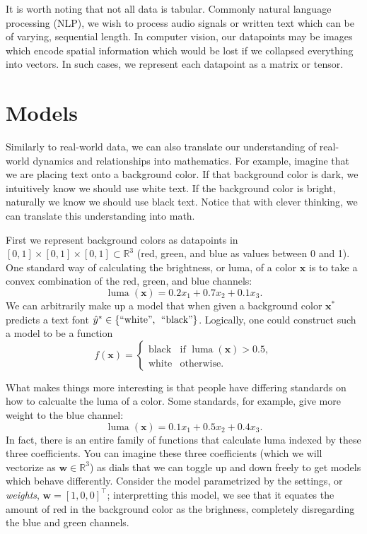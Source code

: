 It is worth noting that not all data is tabular. Commonly natural language processing (NLP), we wish to process audio signals or written text which can be of varying, sequential length. In computer vision, our datapoints may be images which encode spatial information which would be lost if we collapsed everything into vectors. In such cases, we represent each datapoint as a matrix or tensor.

\section{Models}
Similarly to real-world data, we can also translate our understanding of real-world dynamics and relationships into mathematics. For example, imagine that we are placing text onto a background color. If that background color is dark, we intuitively know we should use white text. If the background color is bright, naturally we know we should use black text. Notice that with clever thinking, we can translate this understanding into math.

First we represent background colors as datapoints in $[0, 1] \times [0, 1] \times [0, 1] \subset \mathbb R^3$ (red, green, and blue as values between 0 and 1). One standard way of calculating the brightness, or luma, of a color $\bm x$ is to take a convex combination of the red, green, and blue channels: $$\operatorname{luma}(\bm x) = 0.2 x_1 + 0.7 x_2 + 0.1 x_3.$$ We can arbitrarily make up a model that when given a background color $\bm x^*$ predicts a text font $\hat y^* \in \{\text{``white'',\; ``black''}\}$. Logically, one could construct such a model to be a function $$f(\mathbf x) = \begin{cases} \text{black} & \text{if } \operatorname{luma}(\mathbf x) > 0.5, \\ \text{white} & \text{otherwise}. \end{cases}$$

What makes things more interesting is that people have differing standards on how to calcualte the luma of a color. Some standards, for example, give more weight to the blue channel: $$\operatorname{luma}(\mathbf x) = 0.1 x_1 + 0.5 x_2 + 0.4 x_3.$$ In fact, there is an entire family of functions that calculate luma indexed by these three coefficients. You can imagine these three coefficients (which we will vectorize as $\bm w \in \mathbb R^3$) as dials that we can toggle up and down freely to get models which behave differently. Consider the model parametrized by the settings, or \emph{weights}, $\bm w = [1, 0, 0]^\top$; interpretting this model, we see that it equates the amount of red in the background color as the brighness, completely disregarding the blue and green channels.

